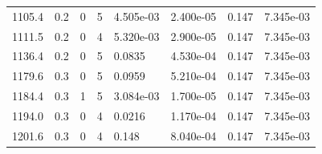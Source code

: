 \documentclass[preview]{standalone}
\begin{document}
{{{{\begin{tabular}{L{1.2cm}C{1.2cm} C{0.3cm}C{0.5cm} C{1.4cm}C{1.4cm} C{1.4cm}C{1.4cm}}
  1105.4  &   0.2  & 0     &  5 &  4.505e-03  & 2.400e-05  & 0.147 &  7.345e-03   \\ 
  1111.5  &   0.2  & 0     &  4 &  5.320e-03  & 2.900e-05  & 0.147 &  7.345e-03   \\ 
  1136.4  &   0.2  & 0     &  5 &  0.0835  & 4.530e-04  & 0.147 &  7.345e-03   \\ 
  1179.6  &   0.3  & 0     &  5 &  0.0959  & 5.210e-04  & 0.147 &  7.345e-03   \\ 
  1184.4  &   0.3  & 1     &  5 &  3.084e-03  & 1.700e-05  & 0.147 &  7.345e-03   \\ 
  1194.0  &   0.3  & 0     &  4 &  0.0216  & 1.170e-04  & 0.147 &  7.345e-03   \\ 
  1201.6  &   0.3  & 0     &  4 &  0.148  & 8.040e-04  & 0.147 &  7.345e-03   \\ 
\hline 
\end{tabular} 

}}}}
\end{document}
